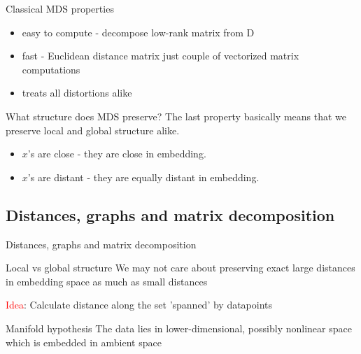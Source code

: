 \documentclass[unknownkeysallowed]{beamer}
\begin{document}
\begin{frame}{Classical MDS properties}

\begin{itemize}
    \item easy to compute - decompose low-rank matrix from D
    \item fast - Euclidean distance matrix just couple of vectorized matrix computations
    \item treats all distortions alike
\end{itemize}



\begin{block}{What structure does MDS preserve?}
The last property basically means that we preserve local and global structure alike.

\begin{itemize}
    \item $x$'s are close - they are close in embedding.
    \item $x$'s are distant - they are equally distant in embedding.
\end{itemize}

\end{block}
\end{frame}
\subsection{Distances, graphs and matrix decomposition}

\begin{frame}{Distances, graphs and matrix decomposition}

\begin{block}{Local vs global structure}
We may not care about preserving exact large distances in embedding space as much as small distances

\textcolor{red}{Idea}: Calculate distance along the set 'spanned' by datapoints
\end{block}

\begin{block}{Manifold hypothesis}
The data lies in lower-dimensional, possibly nonlinear space which is embedded in ambient space
\end{block}



\end{frame}
\end{document}
